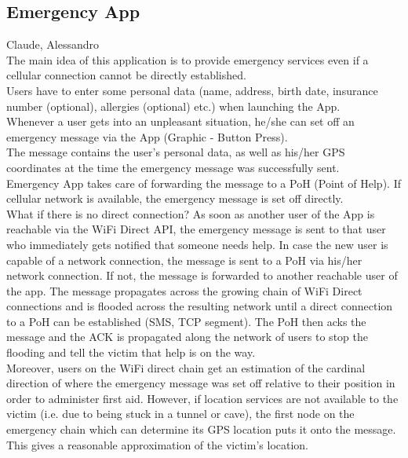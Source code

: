 		\subsection{Emergency App}
		Claude, Alessandro \\
The main idea of this application is to provide emergency services even if a cellular connection cannot be directly established. \\
Users have to enter some personal data (name, address, birth date, insurance number (optional), allergies (optional) etc.) when launching the App. \\
Whenever a user gets into an unpleasant situation, he/she can set off an emergency message via the App (Graphic - Button Press). \\
The message contains the user's personal data, as well as his/her GPS coordinates at the time the emergency message was successfully sent. \\
Emergency App takes care of forwarding the message to a PoH (Point of Help). If cellular network is available, the emergency message is set off directly. \\
What if there is no direct connection? As soon as another user of the App is reachable via the WiFi Direct API, the emergency message is sent to that user who immediately gets notified that someone needs help. In case the new user is capable of a network connection, the message is sent to a PoH via his/her network connection. If not, the message is forwarded to another reachable user of the app. The message propagates across the growing chain of WiFi Direct connections and is flooded across the resulting network until a direct connection to a PoH can be established (SMS, TCP segment). The PoH then acks the message and the ACK is propagated along the network of users to stop the flooding and tell the victim that help is on the way. \\
Moreover, users on the WiFi direct chain get an estimation of the cardinal direction of where the emergency message was set off relative to their position in order to administer first aid.
However, if location services are not available to the victim (i.e. due to being stuck in a tunnel or cave), the first node on the emergency chain which can determine its GPS location puts it onto the message. This gives a reasonable approximation of the victim's location. \\
		
